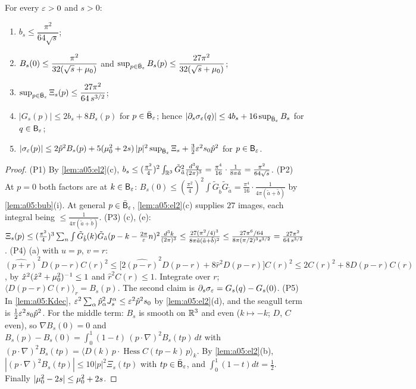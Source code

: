 \begin{lemma}\label{lem:a05:P}
For every $\varepsilon>0$ and $s>0$:
\begin{enumerate}[label=\textup{(P\arabic*)},nosep,leftmargin=*]
\item $b_s\le\dfrac{\pi^2}{64\sqrt s}$;
\item $B_s(0)\le\dfrac{\pi^2}{32(\sqrt s+\mu_0)}$ and $\sup_{p\in\bar{\mathsf B}_{\varepsilon}}B_s(p)\le\dfrac{27\pi^2}{32(\sqrt s+\mu_0)}$;
\item $\sup_{p\in\bar{\mathsf B}_{\varepsilon}}\Xi_s(p)\le\dfrac{27\pi^2}{64\,s^{3/2}}$;
\item $|G_s(p)|\le2b_s+8B_s(p)$ for $p\in\bar{\mathsf B}_{\varepsilon}$; hence $|\partial_s\sigma_{\varepsilon}(q)|\le4b_s+16\sup_{\bar{\mathsf B}_{\varepsilon}}B_s$ for $q\in\mathsf B_{\varepsilon}$;
\item $|\sigma_{\varepsilon}(p)|\le2\hat p^2B_s(p)+5(\mu_0^2+2s)\,|p|^2\sup_{\bar{\mathsf B}_{\varepsilon}}\Xi_s+\frac32\varepsilon^2s_0\hat p^2$ for $p\in\mathsf B_{\varepsilon}$.
\end{enumerate}
\end{lemma}
\begin{proof}
(P1) By \cref{lem:a05:el2}(c), $b_s\le(\frac{\pi^2}4)^2\int_{\mathbb R^3}\tilde G_{\tilde a}^2\frac{d^3q}{(2\pi)^3}=\frac{\pi^4}{16}\cdot\frac1{8\pi\tilde a}=\frac{\pi^2}{64\sqrt s}$.
(P2) At $p=0$ both factors are at $k\in\mathsf B_{\varepsilon}$: $B_s(0)\le(\frac{\pi^2}4)^2\int\tilde G_{\tilde b}\tilde G_{\tilde a}=\frac{\pi^4}{16}\cdot\frac1{4\pi(\tilde a+\tilde b)}$ by \cref{lem:a05:bub}(i). At general $p\in\bar{\mathsf B}_{\varepsilon}$, \cref{lem:a05:el2}(c) supplies $27$ images, each integral being $\le\frac1{4\pi(\tilde a+\tilde b)}$.
(P3) (c), (e): $\Xi_s(p)\le(\frac{\pi^2}4)^3\sum_n\int\tilde G_{\tilde b}(k)\tilde G_{\tilde a}(p-k-\tfrac{2\pi}{\varepsilon} n)^2\frac{d^3k}{(2\pi)^3}\le\frac{27(\pi^2/4)^3}{8\pi\tilde a(\tilde a+\tilde b)^2}\le\frac{27\pi^6/64}{8\pi(\pi/2)^3s^{3/2}}=\frac{27\pi^2}{64\,s^{3/2}}$.
(P4) (a) with $u=p$, $v=r$: $\widehat{(p+r)}^2D(p-r)C(r)^2\le\big[2\widehat{(p-r)}^2D(p-r)+8\hat r^2D(p-r)\big]C(r)^2\le2C(r)^2+8D(p-r)C(r)$, by $\hat x^2(\hat x^2+\mu_0^2)^{-1}\le1$ and $\hat r^2C(r)\le1$. Integrate over $r$; $\langle D(p-r)C(r)\rangle_r=B_s(p)$. The second claim is $\partial_s\sigma_{\varepsilon}=G_s(q)-G_s(0)$.
(P5) In \cref{lem:a05:Kdec}, $\varepsilon^2\sum_\alpha\hat p_\alpha^2J^\alpha_s\le\varepsilon^2\hat p^2s_0$ by \cref{lem:a05:el2}(d), and the seagull term is $\frac12\varepsilon^2s_0\hat p^2$. For the middle term: $B_s$ is smooth on $\mathbb R^3$ and even ($k\mapsto-k$; $D$, $C$ even), so $\nabla B_s(0)=0$ and $B_s(p)-B_s(0)=\int_0^1(1-t)\,(p\cdot\nabla)^2B_s(tp)\,dt$ with $(p\cdot\nabla)^2B_s(tp)=\langle D(k)\,p\cdot\operatorname{Hess}C(tp-k)\,p\rangle_k$. By \cref{lem:a05:el2}(b), $|(p\cdot\nabla)^2B_s(tp)|\le10|p|^2\Xi_s(tp)$ with $tp\in\bar{\mathsf B}_{\varepsilon}$, and $\int_0^1(1-t)dt=\frac12$. Finally $|\mu_0^2-2s|\le\mu_0^2+2s$.
\end{proof}

